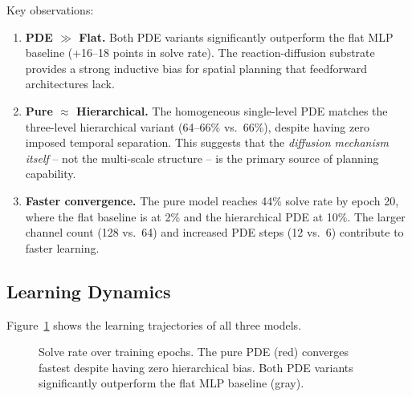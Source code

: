 \documentclass{article}
\begin{document}
Key observations:

\begin{enumerate}
    \item \textbf{PDE $\gg$ Flat.} Both PDE variants significantly outperform the flat MLP baseline (+16--18 points in solve rate). The reaction-diffusion substrate provides a strong inductive bias for spatial planning that feedforward architectures lack.
    \item \textbf{Pure $\approx$ Hierarchical.} The homogeneous single-level PDE matches the three-level hierarchical variant (64--66\% vs.\ 66\%), despite having zero imposed temporal separation. This suggests that the \emph{diffusion mechanism itself} -- not the multi-scale structure -- is the primary source of planning capability.
    \item \textbf{Faster convergence.} The pure model reaches 44\% solve rate by epoch 20, where the flat baseline is at 2\% and the hierarchical PDE at 10\%. The larger channel count (128 vs.\ 64) and increased PDE steps (12 vs.\ 6) contribute to faster learning.
\end{enumerate}

\subsection{Learning Dynamics}

Figure~\ref{fig:learning_curves} shows the learning trajectories of all three models.

\begin{figure}[h]
\centering
{}
\caption{Solve rate over training epochs. The pure PDE (red) converges fastest despite having zero hierarchical bias. Both PDE variants significantly outperform the flat MLP baseline (gray).}
\label{fig:learning_curves}
\end{figure}
\end{document}
